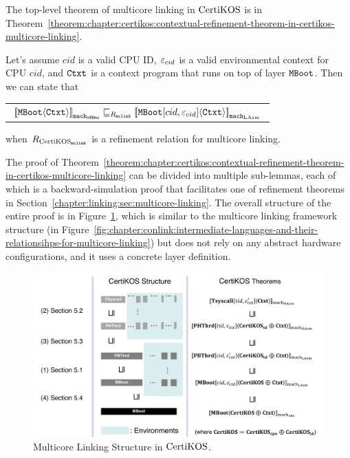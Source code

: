 The top-level theorem of
multicore linking in $\mathrm{CertiKOS}$  is in Theorem~\ref{theorem:chapter:certikos:contextual-refinement-theorem-in-certikos-multicore-linking}.
\begin{theorem}
\label{theorem:chapter:certikos:contextual-refinement-theorem-in-certikos-multicore-linking}
Let's assume  $cid$ is a valid CPU ID, ${\varepsilon}_{cid}$ is a valid
environmental context for CPU $cid$, and ${\mathrm{\texttt{Ctxt}}}$ is a
 context program that runs on top of layer ${\mathrm{\texttt{MBoot}}}$. 
 Then we can state that
 \begin{center}
\begin{tabular}{c}
${[\![{{\mathrm{\texttt{MBoot}}}} \langle {{\mathrm{\texttt{Ctxt}}}} \rangle]\!]}_{{\mathrm{\texttt{mach}}}_{{\mathrm{\texttt{x86mc}}}}} \sqsubseteq_{R_{{\mathrm{\texttt{mclink}}}}} {[\![{{\mathrm{\texttt{MBoot}}}[cid, {\varepsilon}_{cid}]} \langle {{\mathrm{\texttt{Ctxt}}}} \rangle]\!]}_{{{\mathrm{\texttt{mach}}}_{\mathrm{LAsm}}}}$\\
\end{tabular}
\end{center}
when ${R_{\mathrm{CertiKOS}_{\mathrm{\texttt{mclink}}}}}$ is a refinement relation for multicore linking.
\end{theorem}


The proof of Theorem~\ref{theorem:chapter:certikos:contextual-refinement-theorem-in-certikos-multicore-linking} 
can be divided into multiple sub-lemmas, each of which is a backward-simulation proof 
that facilitates one of refinement theorems in Section~\ref{chapter:linking:sec:multicore-linking}. 
The overall structure of the entire proof is in Figure~\ref{fig:chapter:certikos:multicore-connect-proof-overall-structure}, which is 
similar to the multicore linking framework structure (in Figure~\ref{fig:chapter:conlink:intermediate-languages-and-their-relationsihps-for-multicore-linking}) but does not rely on
any abstract hardware configurations, and it uses a concrete layer definition. 
 
\begin{figure}
\includegraphics[width=\textwidth, page=2]{figs/certikos/concurrent_linking}
\caption{Multicore Linking Structure in $\mathrm{CertiKOS}$.}
\label{fig:chapter:certikos:multicore-connect-proof-overall-structure}
\end{figure}



